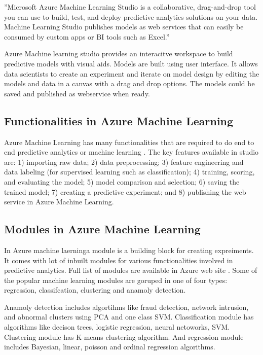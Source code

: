 \documentclass[9pt,twocolumn,twoside]{styles/osajnl}
\newcommand{\TODO}[2][]{\todo[color=red!10,inline,#1]{#2}}
\newcommand{\SE}{\TODO{Spelling}}
\begin{document}
''Microsoft Azure Machine Learning Studio is a collaborative,
drag-and-drop tool you can use to build, test, and deploy predictive
analytics solutions on your data. Machine Learning Studio publishes
models as web services that can easily be consumed by custom apps or
BI tools such as Excel.'' \cite{www-azureMLStudioSite} 

Azure Machine learning studio provides an interacitve workspace to
build predictive models with visual aids. Models are built using user
interface. It allows data scientists to create an experiment and
iterate on model design by editing the models and data in a canvas
with a drag and drop options.  The models could be saved and published
as webservice when ready. 

\subsection{Functionalities in Azure Machine Learning}

Azure Machine Learning has many functionalities that are required to
do end to end predictive analytics or machine
learning \cite{www-azureMLStudioCapabilities}. The key features
available in studio are: 1) importing raw data; 2) data preprocessing;
3) feature engineering and data labeling (for supervised learning such
as classification); 4) training, scoring, and evaluating the model; 5)
model comparison and selection; 6) saving the trained model; 7)
creating a predictive experiment; and 8) publishing the web service in
Azure Machine Learning.

\subsection{Modules in Azure Machine Learning}
In Azure machine laerning\SE a module is a building block for creating
expreiments. It comes with lot of inbuilt modules for various
functionalities involved in predictive analytics. Full list of modules
are available in Azure web site \cite{www-azureMLModules}. Some of the
popular machine learning modules are goruped in one of four types:
regression, classifcation, clustering and anamoly detection.

Anamoly detection includes algortihms like fraud detection, network
intrusion, and abnormal clusters using PCA and one class
SVM. Classification module has algorithms like decison trees, logistic
regression, neural netoworks, SVM. Clustering module has K-means
clustering algorithm. And regression module includes Bayesian, linear,
poisson and ordinal regression algorithms.
\end{document}
